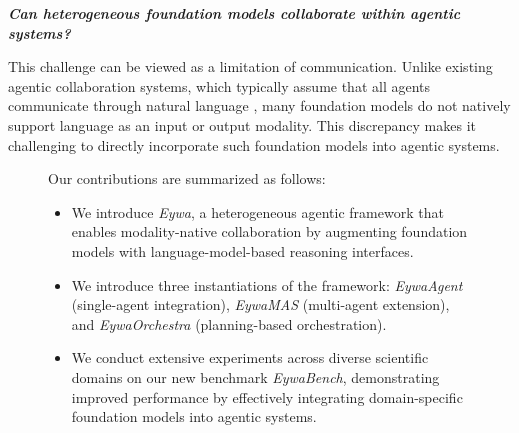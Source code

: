 \documentclass{llmxive}
\begin{document}
{\begin{center}{
\centering\textit{\textbf{
Can heterogeneous foundation models collaborate within agentic systems?
}}
}
\end{center}
\vspace{-3mm}

This challenge can be viewed as a limitation of communication. Unlike existing agentic collaboration systems, which typically assume that all agents communicate through natural language \cite{DBLP:conf/ijcai/GuoCWCPCW024, DBLP:conf/iclr/HongZCZCWZWYLZR24, DBLP:conf/uist/ParkOCMLB23, DBLP:journals/corr/abs-2502-14321, DBLP:journals/corr/abs-2501-06322}, 
many foundation models do not natively support language as an input or output modality. This discrepancy makes it challenging to directly incorporate such foundation models into agentic systems.

\begin{figure}[t]
\vspace{-3mm}
\centering
\begin{tcolorbox}[agentstruct,title=\textbf{Contributions}]
Our contributions are summarized as follows:
\begin{itemize}
    \item We introduce \textit{Eywa}, a heterogeneous agentic framework that enables modality-native collaboration by augmenting foundation models with language-model-based reasoning interfaces.
    \item We introduce three instantiations of the framework: \textit{EywaAgent} (single-agent integration), \textit{EywaMAS} (multi-agent extension), and \textit{EywaOrchestra} (planning-based orchestration).
    \item We conduct extensive experiments across diverse scientific domains on our new benchmark \textit{EywaBench}, demonstrating improved performance by effectively integrating domain-specific foundation models into agentic systems.
\end{itemize}
\end{tcolorbox}
\vspace{-3mm}
\end{figure}

}
\end{document}
